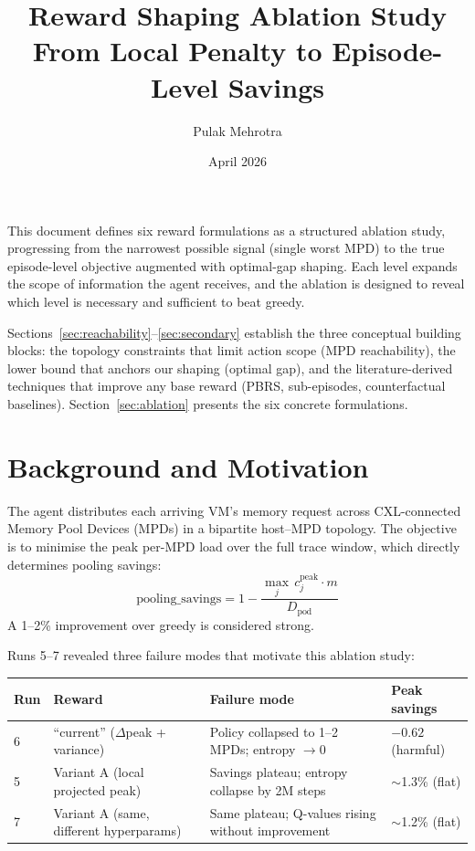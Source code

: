 \documentclass[11pt]{article}
\title{Reward Shaping Ablation Study\\
\large From Local Penalty to Episode-Level Savings}
\author{Pulak Mehrotra}
\date{April 2026}
\begin{document}
\maketitle
\tableofcontents
\newpage

\bigskip\noindent
This document defines six reward formulations as a structured ablation
study, progressing from the narrowest possible signal (single worst MPD)
to the true episode-level objective augmented with optimal-gap shaping.
Each level expands the scope of information the agent receives, and the
ablation is designed to reveal which level is necessary and sufficient to
beat greedy.

Sections~\ref{sec:reachability}--\ref{sec:secondary} establish the three
conceptual building blocks: the topology constraints that limit action scope
(MPD reachability), the lower bound that anchors our shaping (optimal gap),
and the literature-derived techniques that improve any base reward (PBRS,
sub-episodes, counterfactual baselines).
Section~\ref{sec:ablation} presents the six concrete formulations.

\section{Background and Motivation}
\label{sec:background}

The agent distributes each arriving VM's memory request across
CXL-connected Memory Pool Devices (MPDs) in a bipartite host--MPD topology.
The objective is to minimise the peak per-MPD load over the full trace
window, which directly determines pooling savings:
\begin{equation}
  \text{pooling\_savings}
  = 1 - \frac{\max_j\, c_j^{\text{peak}} \cdot m}{D_{\text{pod}}}
  \label{eq:ps}
\end{equation}
A 1--2\% improvement over greedy is considered strong.

Runs 5--7 revealed three failure modes that motivate this ablation study:

\begin{center}
\small
\renewcommand{\arraystretch}{1.3}
\begin{tabular}{llll}
\toprule
\textbf{Run} & \textbf{Reward} & \textbf{Failure mode} & \textbf{Peak savings} \\
\midrule
6 & ``current'' ($\Delta$peak + variance) &
  Policy collapsed to 1--2 MPDs; entropy $\to 0$ &
  $-0.62$ (harmful) \\
5 & Variant A (local projected peak) &
  Savings plateau; entropy collapse by 2M steps &
  $\sim$1.3\% (flat) \\
7 & Variant A (same, different hyperparams) &
  Same plateau; Q-values rising without improvement &
  $\sim$1.2\% (flat) \\
\bottomrule
\end{tabular}
\end{center}
\end{document}

